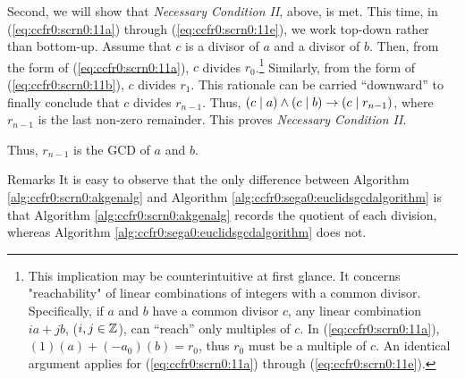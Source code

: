 \begin{vworkalgorithmproof}
Second, we will show that \emph{Necessary Condition II}, above, is met.
This time, in (\ref{eq:ccfr0:scrn0:11a}) through (\ref{eq:ccfr0:scrn0:11e}),
we work top-down rather than bottom-up.  Assume that $c$ is a divisor
of $a$ and a divisor of $b$.  Then, from the form of (\ref{eq:ccfr0:scrn0:11a}),
$c$ divides $r_0$.\footnote{This implication may be counterintuitive
at first glance.  It concerns "reachability" of linear combinations
of integers with a common divisor.  Specifically, if 
$a$ and $b$ have a common divisor $c$, any linear combination
$ia + jb$, ($i,j \in {\mathbb{Z}}$),  can ``reach'' only multiples of $c$.
In (\ref{eq:ccfr0:scrn0:11a}), $(1)(a)+(-a_0)(b)=r_0$, thus
$r_0$ must be a multiple of $c$.  An identical argument applies for
(\ref{eq:ccfr0:scrn0:11a}) through (\ref{eq:ccfr0:scrn0:11e}).}
Similarly, from the form of (\ref{eq:ccfr0:scrn0:11b}),
$c$ divides $r_1$.  This rationale can be carried ``downward'' to finally
conclude that $c$ divides $r_{n-1}$.  Thus, 
$(c \mid a) \wedge (c \mid b) \to (c \mid r_{n-1})$,
where $r_{n-1}$ is the last non-zero remainder.  This proves
\emph{Necessary Condition II}.

Thus, $r_{n-1}$ is the GCD of $a$ and $b$.
\end{vworkalgorithmproof}
\begin{vworkalgorithmparsection}{Remarks}
It is easy to observe that the only difference between
Algorithm \ref{alg:ccfr0:scrn0:akgenalg} and
Algorithm \ref{alg:ccfr0:sega0:euclidsgcdalgorithm} is
that Algorithm \ref{alg:ccfr0:scrn0:akgenalg} records the
quotient of each division, whereas 
Algorithm \ref{alg:ccfr0:sega0:euclidsgcdalgorithm}
does not.
\end{vworkalgorithmparsection}

